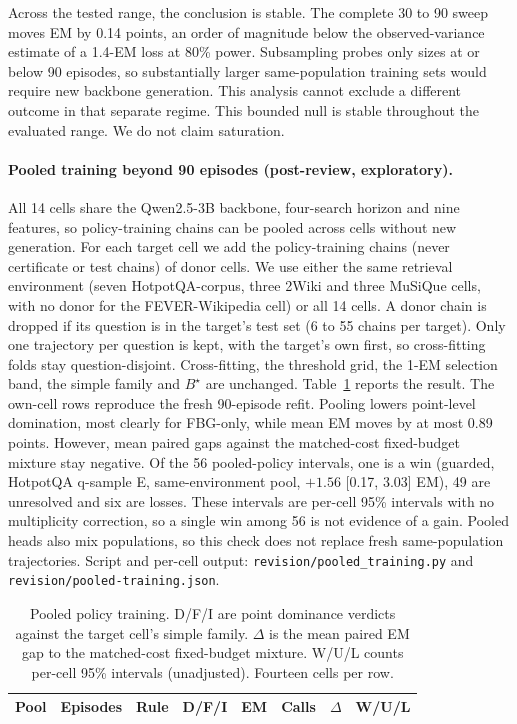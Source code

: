 \documentclass[manuscript,nonacm]{acmart}
\begin{document}
Across the tested range, the conclusion is stable. The complete 30 to 90 sweep
moves EM by 0.14 points, an order of magnitude below the observed-variance
estimate of a 1.4-EM loss at 80\% power. Subsampling probes only sizes at or below 90 episodes,
so substantially larger same-population training sets would require new
backbone generation. This analysis cannot exclude a different outcome in
that separate regime. This bounded null is stable throughout the evaluated
range. We do not claim saturation.

\paragraph{Pooled training beyond 90 episodes (post-review, exploratory).}
All 14 cells share the Qwen2.5-3B backbone, four-search horizon and nine
features, so policy-training chains can be pooled across cells without new
generation. For each target cell we add the policy-training chains (never
certificate or test chains) of donor cells. We use either the same retrieval
environment (seven HotpotQA-corpus, three 2Wiki and three MuSiQue cells, with
no donor for the FEVER-Wikipedia cell) or all 14 cells. A donor chain is dropped if
its question is in the target's test set (6 to 55 chains per target). Only
one trajectory per question is kept, with the target's own first, so cross-fitting
folds stay question-disjoint. Cross-fitting, the threshold grid, the 1-EM
selection band, the simple family and $B^\star$ are unchanged.
Table~\ref{tab:supp-pooled} reports the result. The own-cell rows reproduce the
fresh 90-episode refit. Pooling lowers point-level domination, most clearly for
FBG-only, while mean EM moves by at most 0.89 points. However, mean paired gaps
against the matched-cost fixed-budget mixture stay negative. Of the 56
pooled-policy intervals, one is a win (guarded, HotpotQA q-sample E, same-environment pool,
$+1.56$ [0.17, 3.03] EM), 49 are unresolved and six are losses. These intervals
are per-cell 95\% intervals with no multiplicity correction, so a single win
among 56 is not evidence of a gain. Pooled heads also mix populations, so this
check does not replace fresh same-population trajectories. Script and per-cell
output: \texttt{revision/pooled\_training.py} and
\texttt{revision/pooled-training.json}.

\begin{table}[htbp]
\caption{Pooled policy training. D/F/I are point dominance verdicts against
the target cell's simple family. $\Delta$ is the mean paired EM gap to the
matched-cost fixed-budget mixture. W/U/L counts per-cell 95\% intervals
(unadjusted). Fourteen cells per row.}
\label{tab:supp-pooled}
\footnotesize
\setlength{\tabcolsep}{3pt}
\begin{tabular}{@{}lllrrrrr@{}}
\toprule
Pool & Episodes & Rule & D/F/I & EM & Calls & $\Delta$ & W/U/L \\
\midrule

\bottomrule
\end{tabular}
\end{table}
\end{document}
